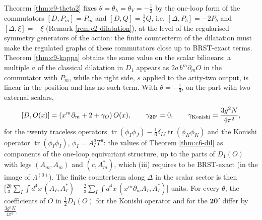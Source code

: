 \begin{remark}
Theorem \ref{thm:c9-theta2} fixes $\theta=\theta_\lambda=\theta_V=-\tfrac13$ by the one-loop form of the commutators $[D,P_m]=P_m$ and $[D,Q]=\tfrac12Q$, i.e. $[\Delta,P_b]=-2P_b$ and $[\Delta,\xi]=-\xi$ (Remark \ref{rem:c2-dilatation}), at the level of the regularised symmetry generators of the action: the finite counterterm of the dilatation must make the regulated graphs of these commutators close up to BRST-exact terms. Theorem \ref{thm:c9-kappa} obtains the same value on the scalar bilinears: a multiple $a$ of the classical dilatation in $D_1$ appears as $2a\,b^m\partial_mO$ in the commutator with $P_m$, while the right side, $s$ applied to the arity-two output, is linear in the position and has no such term. With $\theta=-\tfrac13$, on the part with two external scalars,
\[
[D,O(x)]=(x^m\partial_m+2+\gamma_O)\,O(x),\qquad \gamma_{\mathbf{20'}}=0,\qquad \gamma_{\rm Konishi}=\frac{3g^2N}{4\pi^2},
\]
for the twenty traceless operators $\operatorname{tr}(\phi_I\phi_J)-\tfrac16\delta_{IJ}\operatorname{tr}(\phi_K\phi_K)$ and the Konishi operator $\operatorname{tr}(\phi_I\phi_I)$, $\phi_I=A^a_IT^a$: the values of Theorem \ref{thm:c6-dil} as components of the one-loop equivariant structure, up to the parts of $D_1(O)$ with legs $(A_m,A_m)$ and $(c,A^*_m)$, which (iii) requires to be BRST-exact (in the image of $\Lambda^{(0)}$). The finite counterterm along $\Delta$ in the scalar sector is then $\big[\tfrac{20}3\sum_I\int d^4x\,(A_I,A^*_I)-\tfrac23\sum_I\int d^4x\,(x^m\partial_mA_I,A^*_I)\big]$ units. For every $\theta$, the coefficients of $O$ in $\tfrac12D_1(O)$ for the Konishi operator and for the $\mathbf{20'}$ differ by $\tfrac{3g^2N}{4\pi^2}$.
\end{remark}

